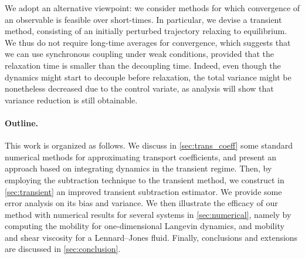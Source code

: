 We adopt an alternative viewpoint: we consider methods for which convergence of an observable is feasible over short-times. In particular, we devise a transient method, consisting of an initially perturbed trajectory relaxing to equilibrium. We thus do not require long-time averages for convergence, 
which suggests that we can use synchronous coupling under weak conditions, provided that the relaxation time is smaller than the decoupling time. Indeed, even though the dynamics might start to decouple before relaxation, the total variance might be nonetheless decreased due to the control variate, as analysis will show that variance reduction is still obtainable.

\paragraph{Outline.} This work is organized as follows. We discuss in \cref{sec:trans_coeff} some standard numerical methods for approximating transport coefficients, and present an approach based on integrating dynamics in the transient regime. Then, by employing the subtraction technique to the transient method, we construct in \cref{sec:transient} an improved transient subtraction estimator. We provide some error analysis on its bias and variance. We then illustrate the efficacy of our method with numerical results for several systems in \cref{sec:numerical}, namely by computing the mobility for one-dimensional Langevin dynamics, and mobility and shear viscosity for a Lennard--Jones fluid. Finally, conclusions and extensions are discussed in \cref{sec:conclusion}.